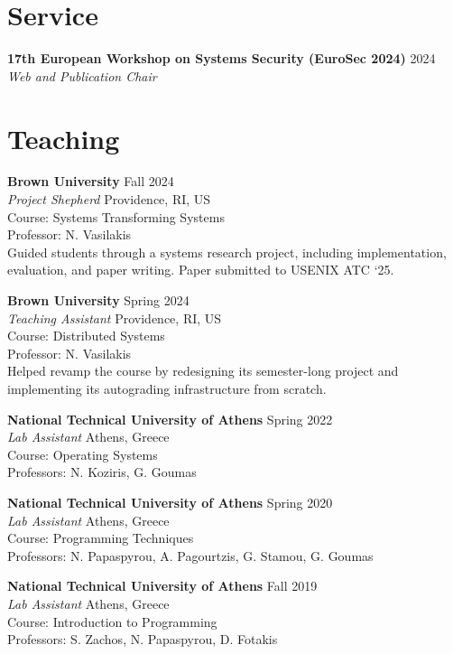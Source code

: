 \documentclass[margin, 12pt]{resume}
\newcommand{\stitle}[1]{#1:\xspace}
\newcommand{\institution}[1]{\textbf{#1}\xspace}
\newcommand{\role}[1]{\textit{#1}\xspace}
\newcommand{\service}[1]{\textbf{#1}\xspace}
\begin{document}
\begin{resume}
\section{Service}

\service{17th European Workshop on Systems Security (EuroSec 2024)} \hfill 2024 \\
\role{Web and Publication Chair}

\section{Teaching}

\institution{Brown University} \hfill Fall 2024 \\
\role{Project Shepherd} \hfill Providence, RI, US \\
\stitle{Course} Systems Transforming Systems \\
\stitle{Professor} N. Vasilakis \\
Guided students through a systems research project, including implementation, evaluation, and paper writing. Paper submitted to USENIX ATC `25.

\institution{Brown University} \hfill Spring 2024 \\
\role{Teaching Assistant} \hfill Providence, RI, US \\
\stitle{Course} Distributed Systems \\
\stitle{Professor} N. Vasilakis \\
Helped revamp the course by redesigning its semester-long project and implementing its autograding infrastructure from scratch.

\institution{National Technical University of Athens} \hfill Spring 2022 \\
\role{Lab Assistant} \hfill Athens, Greece \\
\stitle{Course} Operating Systems \\
\stitle{Professors} N. Koziris, G. Goumas

\institution{National Technical University of Athens} \hfill Spring 2020 \\
\role{Lab Assistant} \hfill Athens, Greece \\
\stitle{Course} Programming Techniques \\
\stitle{Professors} N. Papaspyrou, A. Pagourtzis, G. Stamou, G. Goumas

\institution{National Technical University of Athens} \hfill Fall 2019 \\
\role{Lab Assistant} \hfill Athens, Greece \\
\stitle{Course} Introduction to Programming \\
\stitle{Professors} S. Zachos, N. Papaspyrou, D. Fotakis


\end{resume}
\end{document}
